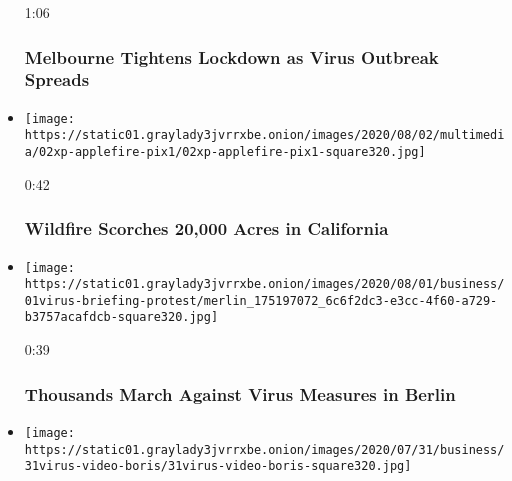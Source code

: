 \begin{itemize}
  1:06

  \hypertarget{melbourne-tightens-lockdown-as-virus-outbreak-spreads}{%
  \subsubsection{Melbourne Tightens Lockdown as Virus Outbreak
  Spreads}\label{melbourne-tightens-lockdown-as-virus-outbreak-spreads}}
\item
  \href{https://www.nytimes3xbfgragh.onion/video/us/100000007268937/wildfire-scorches-15000-acres-in-california.html?action=click\&module=video-series-bar\&region=header\&pgtype=Article\&playlistId=video/coronavirus-news-update}{}

  \texttt{[image: https://static01.graylady3jvrrxbe.onion/images/2020/08/02/multimedia/02xp-applefire-pix1/02xp-applefire-pix1-square320.jpg]}

  0:42

  \hypertarget{wildfire-scorches-20000-acres-in-california}{%
  \subsubsection{Wildfire Scorches 20,000 Acres in
  California}\label{wildfire-scorches-20000-acres-in-california}}
\item
  \href{https://www.nytimes3xbfgragh.onion/video/world/europe/100000007268465/coronavirus-protest-germany.html?action=click\&module=video-series-bar\&region=header\&pgtype=Article\&playlistId=video/coronavirus-news-update}{}

  \texttt{[image: https://static01.graylady3jvrrxbe.onion/images/2020/08/01/business/01virus-briefing-protest/merlin\_175197072\_6c6f2dc3-e3cc-4f60-a729-b3757acafdcb-square320.jpg]}

  0:39

  \hypertarget{thousands-march-against-virus-measures-in-berlin}{%
  \subsubsection{Thousands March Against Virus Measures in
  Berlin}\label{thousands-march-against-virus-measures-in-berlin}}
\item
  \href{https://www.nytimes3xbfgragh.onion/video/us/politics/100000007266983/johnson-coronavirus-restrictions.html?action=click\&module=video-series-bar\&region=header\&pgtype=Article\&playlistId=video/coronavirus-news-update}{}

  \texttt{[image: https://static01.graylady3jvrrxbe.onion/images/2020/07/31/business/31virus-video-boris/31virus-video-boris-square320.jpg]}


\end{itemize}
